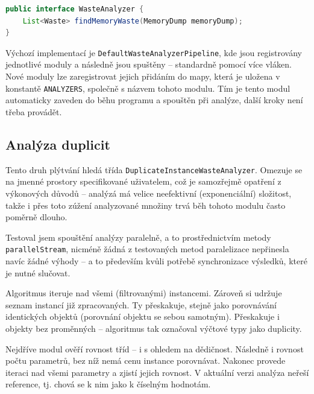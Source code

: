 \begin{lstlisting}[caption={Rozhraní pro analýzu plýtvání paměti ve zpracovaném dumpu}, label={waste-analyzer}, frame={single}, language={java}, float,floatplacement=H]
public interface WasteAnalyzer {
    List<Waste> findMemoryWaste(MemoryDump memoryDump);
}
\end{lstlisting}

Výchozí implementací je \texttt{DefaultWasteAnalyzerPipeline}, kde jsou registrovány jednotlivé moduly a následně jsou spuštěny -- standardně pomocí více vláken. Nové moduly lze zaregistrovat jejich přidáním do mapy, která je uložena v konstantě \texttt{ANALYZERS}, společně s názvem tohoto modulu. Tím je tento modul automaticky zaveden do běhu programu a spouštěn při analýze, další kroky není třeba provádět. 

\subsection{Analýza duplicit}
Tento druh plýtvání hledá třída \texttt{DuplicateInstanceWasteAnalyzer}. Omezuje se na jmenné prostory specifikované uživatelem, což je samozřejmě opatření z výkonových důvodů -- analýzá má velice neefektivní (exponenciální) složitost, takže i přes toto zúžení analyzované množiny trvá běh tohoto modulu často poměrně dlouho. 

Testoval jsem spouštění analýzy paralelně, a to prostřednictvím metody \texttt{parallelStream}, nicméně žádná z testovaných metod paralelizace nepřinesla navíc žádné výhody -- a to především kvůli potřebě synchronizace výsledků, které je nutné slučovat.

Algoritmus iteruje nad všemi (filtrovanými) instancemi. Zároveň si udržuje seznam instancí již zpracovaných. Ty přeskakuje, stejně jako porovnávání identických objektů (porovnání objektu se sebou samotným). Přeskakuje i objekty bez proměnných -- algoritmus tak označoval výčtové typy jako duplicity.

Nejdříve modul ověří rovnost tříd -- i s ohledem na dědičnost. Následně i rovnost počtu parametrů, bez níž nemá cenu instance porovnávat. Nakonec provede iteraci nad všemi parametry a zjistí jejich rovnost. V aktuální verzi analýza neřeší reference, tj. chová se k nim jako k číselným hodnotám.

